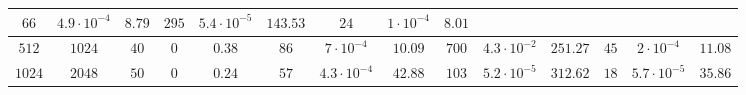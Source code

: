 \documentclass[twocolumn]{svjour3}
\begin{document}
\begin{table*}
\begin{center}
\begin{tabular}{|c|c|c|c|c|c|c|c|c|c|c|c|c|c}
\multicolumn{1}{|c}{$66$} & \multicolumn{1}{c}{$4.9\cdot 10^{-4}$} & \multicolumn{1}{c|}{$8.79$} &
\multicolumn{1}{|c}{$295$} & \multicolumn{1}{c}{$5.4\cdot 10^{-5}$} & \multicolumn{1}{c|}{$143.53$} &
\multicolumn{1}{|c}{$24$} & \multicolumn{1}{c}{$1\cdot 10^{-4}$} & \multicolumn{1}{c}{$8.01$} \\
\hline
\multicolumn{1}{c}{$512$} & \multicolumn{1}{c}{$1024$} & \multicolumn{1}{c}{$40$} & \multicolumn{1}{c|}{$0$} & $ 0.38 $ & 
\multicolumn{1}{|c}{$86$} & \multicolumn{1}{c}{$7\cdot 10^{-4}$} & \multicolumn{1}{c|}{$10.09$} &
\multicolumn{1}{|c}{$700$} & \multicolumn{1}{c}{$4.3\cdot 10^{-2}$} & \multicolumn{1}{c|}{$251.27$} &
\multicolumn{1}{|c}{$45$} & \multicolumn{1}{c}{$2\cdot 10^{-4}$} & \multicolumn{1}{c}{$11.08$} \\
\hline
\multicolumn{1}{c}{$1024$} & \multicolumn{1}{c}{$2048$} & \multicolumn{1}{c}{$50$} & \multicolumn{1}{c|}{$0$} & $ 0.24 $ & 
\multicolumn{1}{|c}{$57$} & \multicolumn{1}{c}{$4.3\cdot 10^{-4}$} & \multicolumn{1}{c|}{$42.88$} &
\multicolumn{1}{|c}{$103$} & \multicolumn{1}{c}{$5.2\cdot 10^{-5}$} & \multicolumn{1}{c|}{$312.62$} &
\multicolumn{1}{|c}{$18$} & \multicolumn{1}{c}{$5.7\cdot 10^{-5}$} & \multicolumn{1}{c}{$35.86$} \\
\hline \hline \hline


\end{tabular}
\end{center}
\end{table*}
\end{document}
